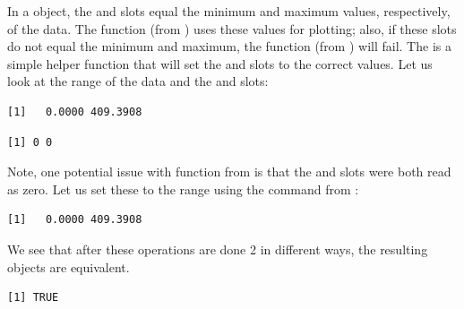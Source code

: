 In a  object, the  and  slots equal the minimum and maximum values, respectively, of the data.   The  function (from ) uses these values for plotting; also, if these slots do not equal the minimum and maximum, the  function (from ) will fail.  The  is a simple helper function that will set the   and  slots to the correct values.  Let us look at the range of the data and the  and  slots:
\begin{knitrout}
\color{fgcolor}\begin{kframe}
\begin{alltt}
\end{alltt}
\begin{verbatim}
[1]   0.0000 409.3908
\end{verbatim}
\begin{alltt}
\hlstd{)}
\end{alltt}
\begin{verbatim}
[1] 0 0
\end{verbatim}
\end{kframe}
\end{knitrout}
Note, one potential issue with  function from  is that the  and  slots were both read as zero.  Let us set these to the range using the  command from :
\begin{knitrout}
\color{fgcolor}\begin{kframe}
\begin{alltt}
 \hlkwb{=} 
\end{alltt}
\begin{verbatim}
[1]   0.0000 409.3908
\end{verbatim}
\end{kframe}
\end{knitrout}
We see that after these operations are done 2 in different ways, the resulting  objects are equivalent.  
\begin{knitrout}
\color{fgcolor}\begin{kframe}
\begin{alltt}
\end{alltt}
\begin{verbatim}
[1] TRUE
\end{verbatim}
\end{kframe}
\end{knitrout}

